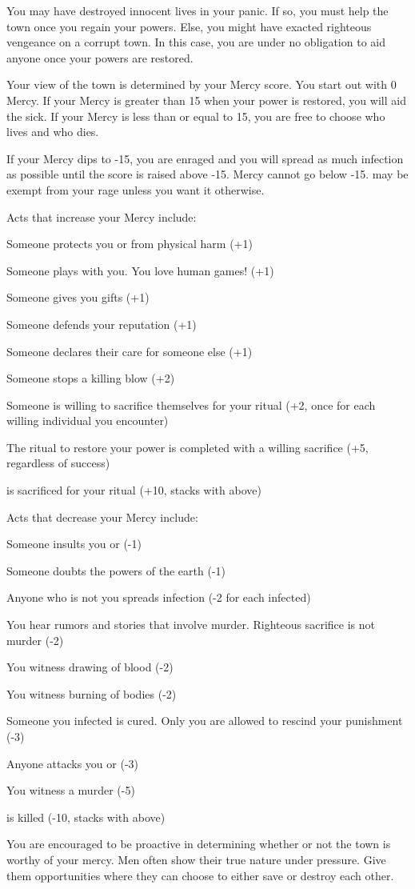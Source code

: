 \documentclass[green]{Pestilence}
\begin{document}
\name{\gMercy{}}

You may have destroyed innocent lives in your panic. If so, you must help the town once you regain your powers. Else, you might have exacted righteous vengeance on a corrupt town. In this case, you are under no obligation to aid anyone once your powers are restored.

Your view of the town is determined by your Mercy score. You start out with 0 Mercy. If your Mercy is greater than 15 when your power is restored, you will aid the sick. If your Mercy is less than or equal to 15, you are free to choose who lives and who dies. 

If your Mercy dips to -15, you are enraged and you will spread as much infection as possible until the score is raised above -15. Mercy cannot go below -15. \cShaman{} may be exempt from your rage unless you want it otherwise.

Acts that increase your Mercy include:

\begin{itemz}
	\item Someone protects you or \cShaman{} from physical harm (+1)
	\item Someone plays with you. You love human games! (+1)
	\item Someone gives you gifts (+1)
	\item Someone defends your reputation (+1)
	\item Someone declares their care for someone else (+1)
	\item Someone stops a killing blow (+2)
	\item Someone is willing to sacrifice themselves for your ritual (+2, once for each willing individual you encounter)
	\item The ritual to restore your power is completed with a willing sacrifice (+5, regardless of success)
	\item\cElder{\intro} is sacrificed for your ritual (+10, stacks with above)
\end{itemz}

Acts that decrease your Mercy include:

\begin{itemz}
	\item Someone insults you or \cShaman{} (-1)
	\item Someone doubts the powers of the earth (-1)
	\item Anyone who is not you spreads infection (-2 for each infected)
	\item You hear rumors and stories that involve murder. Righteous sacrifice is not murder (-2)
	\item You witness drawing of blood (-2)
	\item You witness burning of bodies (-2)
	\item Someone you infected is cured. Only you are allowed to rescind your punishment (-3)
	\item Anyone attacks you or \cShaman{} (-3)
	\item You witness a murder (-5)
	\item \cShaman{} is killed (-10, stacks with above)
\end{itemz}

You are encouraged to be proactive in determining whether or not the town is worthy of your mercy. Men often show their true nature under pressure. Give them opportunities where they can choose to either save or destroy each other.
\end{document}

